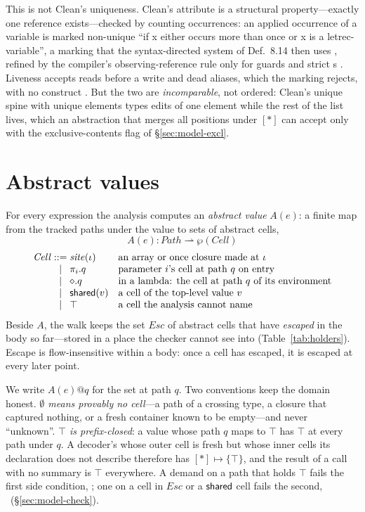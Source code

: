 This is not Clean's uniqueness. Clean's \code{*} attribute is a structural property---exactly one
reference exists---checked by counting occurrences: an applied occurrence of a variable is marked
non-unique ``if x either occurs more than once or x is a letrec-variable'', a marking that the
syntax-directed system of Def.~8.14 then uses \citep[\S8]{barendsen1996uniqueness}, refined by the
compiler's observing-reference rule only for guards and strict s
\citep[\S9.4]{plasmeijer2011clean}. Liveness accepts reads before a write and dead aliases, which the
marking rejects, with no  construct \citep{wadler1990linear}. But the two are
\emph{incomparable}, not ordered: Clean's unique spine with unique elements \citep[\S6]{barendsen1996uniqueness}
types edits of one element while the rest of the list lives, which an abstraction that merges all
positions under $[\ast]$ can accept only with the exclusive-contents flag of \S\ref{sec:model-excl}.

\section{Abstract values}
\label{sec:model-abstract}

For every expression the analysis computes an \emph{abstract value} $A(e)$: a finite map from the
tracked paths under the value to sets of abstract cells,
\[
A(e) : \mathit{Path} \rightharpoonup \wp(\mathit{Cell})
\]
\[
\begin{array}{r@{\;}c@{\;}l@{\quad}l}
\mathit{Cell} & ::= & \site(\iota) & \text{an array or once closure made at } \iota\\
 & \mid & \pi_i.q & \text{parameter } i\text{'s cell at path } q \text{ on entry}\\
 & \mid & \env.q & \text{in a lambda: the cell at path } q \text{ of its environment}\\
 & \mid & \shared(v) & \text{a cell of the top-level value } v\\
 & \mid & \top & \text{a cell the analysis cannot name}
\end{array}
\]
Beside $A$, the walk keeps the set $\mathit{Esc}$ of abstract cells that have \emph{escaped} in the body
so far---stored in a place the checker cannot see into (Table~\ref{tab:holders}). Escape is
flow-insensitive within a body: once a cell has escaped, it is escaped at every later point.

We write $A(e)@q$ for the set at path $q$. Two conventions keep the domain honest. \emph{$\emptyset$
means provably no cell}---a path of a crossing type, a closure that captured nothing, or a fresh
container known to be empty---and never ``unknown''. \emph{$\top$ is prefix-closed}: a value whose path
$q$ maps to $\top$ has $\top$ at every path under $q$. A decoder's  whose outer
cell is fresh but whose inner cells its declaration does not describe therefore has $[\ast] \mapsto
\{\top\}$, and the result of a call with no summary is $\top$ everywhere. A demand on a path that holds
$\top$ fails the first side condition, \Known; one on a cell in $\mathit{Esc}$ or a $\mathsf{shared}$ cell fails
the second, \Unescaped\ (\S\ref{sec:model-check}).

